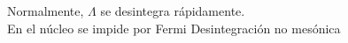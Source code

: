 \documentclass[preview]{standalone}
\begin{document}
\begin{center}
Normalmente, $\Lambda$ se desintegra rápidamente.\\
                     En el núcleo se impide por Fermi \Rightarrow Desintegración no mesónica
\end{center}
\end{document}
